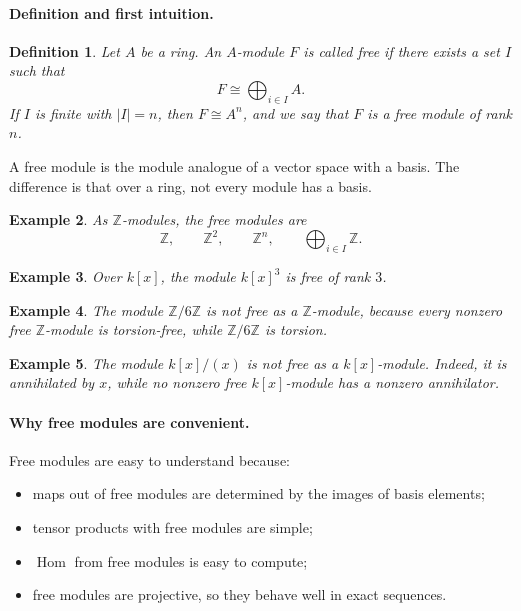 \documentclass[12pt,a4paper]{article}
\theoremstyle{notespace}
\newtheorem{definition}{Definition}[section]
\DeclareMathOperator{\Hom}{Hom}
\newtheorem{example}[definition]{Example}
\newcommand{\ZZ}{\mathbb{Z}}
\begin{document}
\paragraph{Definition and first intuition.}

\begin{definition}
	Let \(A\) be a ring. An \(A\)-module \(F\) is called \emph{free} if there exists a set \(I\) such that
	\[
	F \cong \bigoplus_{i\in I} A.
	\]
	If \(I\) is finite with \(|I|=n\), then \(F\cong A^n\), and we say that \(F\) is a free module of rank \(n\).
\end{definition}

A free module is the module analogue of a vector space with a basis. The difference is that over a ring, not every module has a basis.

\begin{example}
	As \(\ZZ\)-modules, the free modules are
	\[
	\ZZ,\qquad \ZZ^2,\qquad \ZZ^n,\qquad \bigoplus_{i\in I}\ZZ.
	\]
\end{example}

\begin{example}
	Over \(k[x]\), the module \(k[x]^3\) is free of rank \(3\).
\end{example}

\begin{example}
	The module \(\ZZ/6\ZZ\) is not free as a \(\ZZ\)-module, because every nonzero free \(\ZZ\)-module is torsion-free, while \(\ZZ/6\ZZ\) is torsion.
\end{example}

\begin{example}
	The module \(k[x]/(x)\) is not free as a \(k[x]\)-module. Indeed, it is annihilated by \(x\), while no nonzero free \(k[x]\)-module has a nonzero annihilator.
\end{example}

\paragraph{Why free modules are convenient.}

Free modules are easy to understand because:
\begin{itemize}[leftmargin=2em]
	\item maps out of free modules are determined by the images of basis elements;
	\item tensor products with free modules are simple;
	\item \(\Hom\) from free modules is easy to compute;
	\item free modules are projective, so they behave well in exact sequences.
\end{itemize}
\end{document}
